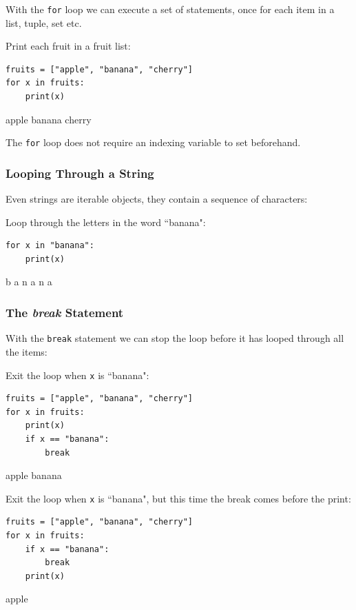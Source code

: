 \documentclass[12pt,a4paper]{article}
\newcommand{\code}[1]{%
	\colorbox{backcolour}{\lstinline{#1}}%
}
\newcommand{\lcode}[1]{%
	\lstinline{#1}%
}
\begin{document}
With the \code{for} loop we can execute a set of statements, once for each item
in a list, tuple, set etc.

\begin{ebox}
Print each fruit in a fruit list:
	\begin{lstlisting}
fruits = ["apple", "banana", "cherry"]
for x in fruits:
    print(x)
	\end{lstlisting}
\tcblower
	\begin{vercode}
apple
banana
cherry
	\end{vercode}
\end{ebox}

The \code{for} loop does not require an indexing variable to set beforehand.

\subsubsection{Looping Through a String}

Even strings are iterable objects, they contain a sequence of characters:

\begin{ebox}
Loop through the letters in the word ``banana":
	\begin{lstlisting}
for x in "banana":
    print(x)
	\end{lstlisting}
\tcblower
	\begin{vercode}
b
a
n
a
n
a
	\end{vercode}
\end{ebox}
\subsubsection{The \textit{break} Statement}

With the \code{break} statement we can stop the loop before it has looped
through all the items:

\begin{ebox}
Exit the loop when \lcode{x} is ``banana":
	\begin{lstlisting}
fruits = ["apple", "banana", "cherry"]
for x in fruits:
    print(x)
    if x == "banana":
        break
	\end{lstlisting}
\tcblower
	\begin{vercode}
apple
banana
	\end{vercode}
\end{ebox}

\begin{ebox}
Exit the loop when \lcode{x} is ``banana", but this time the break comes before
the print:
	\begin{lstlisting}
fruits = ["apple", "banana", "cherry"]
for x in fruits:
    if x == "banana":
        break
    print(x)
	\end{lstlisting}
\tcblower
	\begin{vercode}
apple
	\end{vercode}
\end{ebox}
\end{document}
